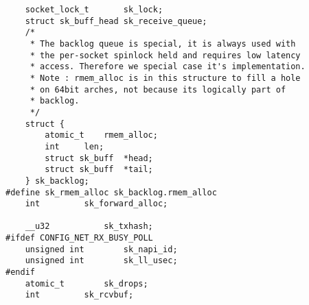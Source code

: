 \begin{verbatim}
    socket_lock_t       sk_lock;
    struct sk_buff_head sk_receive_queue;
    /*
     * The backlog queue is special, it is always used with
     * the per-socket spinlock held and requires low latency
     * access. Therefore we special case it's implementation.
     * Note : rmem_alloc is in this structure to fill a hole
     * on 64bit arches, not because its logically part of
     * backlog.
     */
    struct {
        atomic_t    rmem_alloc;
        int     len;
        struct sk_buff  *head;
        struct sk_buff  *tail;
    } sk_backlog;
#define sk_rmem_alloc sk_backlog.rmem_alloc
    int         sk_forward_alloc;

    __u32           sk_txhash;
#ifdef CONFIG_NET_RX_BUSY_POLL
    unsigned int        sk_napi_id;
    unsigned int        sk_ll_usec;
#endif
    atomic_t        sk_drops;
    int         sk_rcvbuf;


\end{verbatim}
